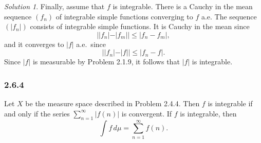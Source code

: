 \documentclass{report}
\theoremstyle{remark}
\newtheorem*{solution}{Solution}
\begin{document}
\begin{solution}
  Finally, assume that $f$ is integrable. There is a Cauchy in the mean sequence $(f_n)$ of integrable simple functions converging to $f$ a.e. The sequence $(|f_n|)$ consists of integrable simple functions. It is Cauchy in the mean since
  \begin{equation*}
    ||f_n| - |f_m|| \le |f_n - f_m|,
  \end{equation*}
  and it converges to $|f|$ a.e.\ since
  \begin{equation*}
    ||f_n| - |f|| \le |f_n - f|.
  \end{equation*}
  Since $|f|$ is measurable by Problem 2.1.9, it follows that $|f|$ is integrable.
\end{solution}

\subsubsection*{2.6.4}
Let $X$ be the measure space described in Problem 2.4.4. Then $f$ is integrable if and only if the series $\sum_{n=1}^\infty |f(n)|$ is convergent. If $f$ is integrable, then
\begin{equation*}
  \int f \, d\mu = \sum_{n=1}^\infty f(n).
\end{equation*}
\end{document}
